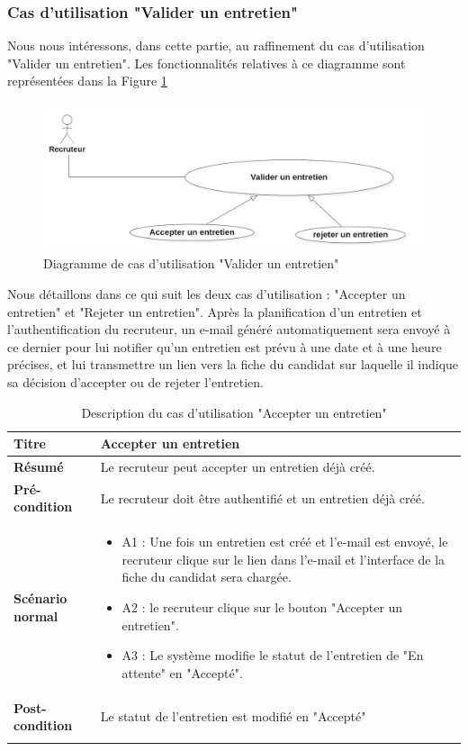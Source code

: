\subsubsection{Cas d'utilisation "Valider un entretien"}
Nous nous intéressons, dans cette partie, au raffinement du cas d'utilisation "Valider un entretien". Les fonctionnalités relatives à ce diagramme sont représentées dans la Figure \ref{fig:valid_entretien}
\begin{figure}[H]
     \centering
     \includegraphics[scale=0.35]{img/raffinement valider un entretien.png}
     \caption{Diagramme de cas d'utilisation "Valider un entretien"}
     \label{fig:valid_entretien}
 \end{figure}
 Nous détaillons dans ce qui suit les deux cas d'utilisation : "Accepter un entretien" et "Rejeter un entretien". Après la planification d'un entretien et l'authentification du recruteur, un e-mail généré automatiquement sera envoyé à ce dernier pour lui notifier qu'un entretien est prévu à une date et à une heure précises, et lui transmettre un lien vers la fiche du candidat sur laquelle il indique sa décision d'accepter ou de rejeter l'entretien.
 \begin{longtable}[c]{
    |p{}|
    |p{}|
}
    \hline
    \textbf{Titre}
    &   Accepter un entretien\\
    \hline
    \textbf{Résumé}
    & Le recruteur peut accepter un entretien déjà créé. \\
    \hline
     \textbf{Pré-condition}
    & Le recruteur doit être authentifié et un entretien déjà créé.\\
    \hline
     \textbf{Scénario normal}
    & \begin{itemize}
        \item A1 : Une fois un entretien est créé et l'e-mail est envoyé, le recruteur clique sur le lien dans l'e-mail et l'interface de la fiche du candidat sera chargée. 
        \item A2 : le recruteur clique sur le bouton "Accepter un entretien".
        \item A3 : Le système modifie le statut de l'entretien de "En attente" en "Accepté".
    \end{itemize}\\
    \hline
    \textbf{Post-condition}
    & Le statut de l'entretien est modifié en "Accepté"\\
    \hline
\caption{Description du cas d'utilisation "Accepter un entretien"}
\label{tab:accept_entretien}
\end{longtable}
